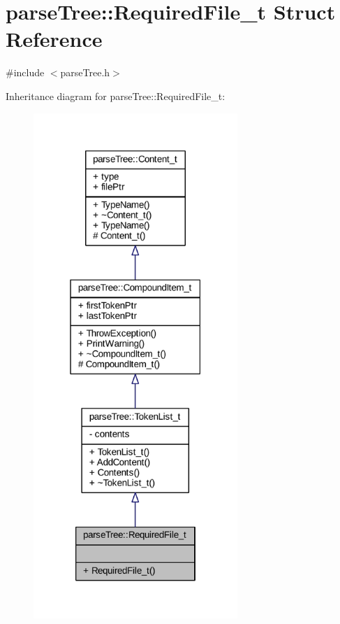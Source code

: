 \hypertarget{structparse_tree_1_1_required_file__t}{}\section{parse\+Tree\+:\+:Required\+File\+\_\+t Struct Reference}
\label{structparse_tree_1_1_required_file__t}


{\ttfamily \#include $<$parse\+Tree.\+h$>$}



Inheritance diagram for parse\+Tree\+:\+:Required\+File\+\_\+t\+:
\nopagebreak
\begin{figure}[H]
\begin{center}
\leavevmode
\includegraphics[width=219pt]{structparse_tree_1_1_required_file__t__inherit__graph}
\end{center}
\end{figure}


